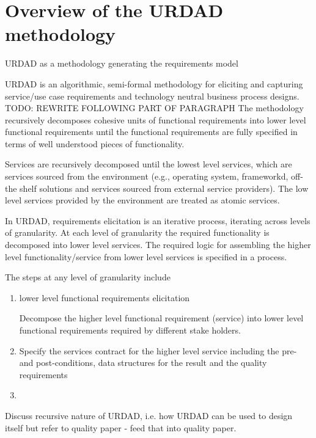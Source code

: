 \section{Overview of the URDAD methodology \label{sec:urdadMethodology}}

URDAD as a methodology generating the requirements model

URDAD is an algorithmic, semi-formal methodology for eliciting and capturing service/use case requirements and technology neutral business process designs\cite{solms_urdad_2010}. 
TODO: REWRITE FOLLOWING PART OF PARAGRAPH
 The methodology recursively decomposes cohesive units of functional requirements into lower level functional requirements until the functional requirements are
fully specified in terms of well understood pieces of functionality.

Services are recursively decomposed until the lowest level services, which are services sourced from the environment (e.g., operating system, frameworkd, off-the shelf solutions and services sourced from external service providers). The low level services provided by the environment are treated as atomic services.

In URDAD, requirements elicitation is an iterative process, iterating across levels of granularity. At each level of granularity the required functionality is decomposed into lower level services. The required logic for assembling the higher level functionality/service from lower level services is specified in a process.

The steps at any level of granularity include
\begin{enumerate}
 \item lower level {functional requirements elicitation}
 
Decompose the higher level functional requirement (service) into lower level functional requirements required by different stake holders.
 \item Specify the services contract for the higher level service including the pre- and post-conditions, data structures for the result and the quality requirements
 \item 
\end{enumerate}

Discuss recursive nature of URDAD, i.e. how URDAD can be used to design itself but refer to quality paper - feed that into quality paper.

